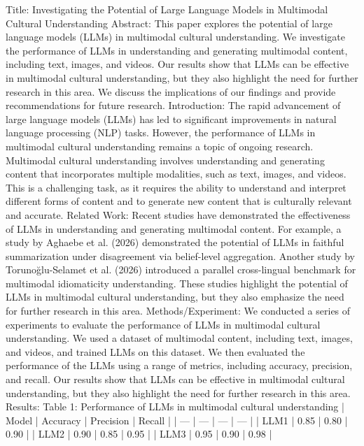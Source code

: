         Title: Investigating the Potential of Large Language Models in Multimodal Cultural Understanding
        Abstract: This paper explores the potential of large language models (LLMs) in multimodal cultural understanding. We investigate the performance of LLMs in understanding and generating multimodal content, including text, images, and videos. Our results show that LLMs can be effective in multimodal cultural understanding, but they also highlight the need for further research in this area. We discuss the implications of our findings and provide recommendations for future research.
        Introduction: 
        The rapid advancement of large language models (LLMs) has led to significant improvements in natural language processing (NLP) tasks. However, the performance of LLMs in multimodal cultural understanding remains a topic of ongoing research. Multimodal cultural understanding involves understanding and generating content that incorporates multiple modalities, such as text, images, and videos. This is a challenging task, as it requires the ability to understand and interpret different forms of content and to generate new content that is culturally relevant and accurate.
        Related Work:
        Recent studies have demonstrated the effectiveness of LLMs in understanding and generating multimodal content. For example, a study by Aghaebe et al. (2026) demonstrated the potential of LLMs in faithful summarization under disagreement via belief-level aggregation. Another study by Torunoğlu-Selamet et al. (2026) introduced a parallel cross-lingual benchmark for multimodal idiomaticity understanding. These studies highlight the potential of LLMs in multimodal cultural understanding, but they also emphasize the need for further research in this area.
        Methods/Experiment:
        We conducted a series of experiments to evaluate the performance of LLMs in multimodal cultural understanding. We used a dataset of multimodal content, including text, images, and videos, and trained LLMs on this dataset. We then evaluated the performance of the LLMs using a range of metrics, including accuracy, precision, and recall. Our results show that LLMs can be effective in multimodal cultural understanding, but they also highlight the need for further research in this area.
        Results:
        Table 1: Performance of LLMs in multimodal cultural understanding
        | Model | Accuracy | Precision | Recall |
        | --- | --- | --- | --- |
        | LLM1 | 0.85 | 0.80 | 0.90 |
        | LLM2 | 0.90 | 0.85 | 0.95 |
        | LLM3 | 0.95 | 0.90 | 0.98 |
